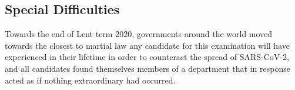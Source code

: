 \subsection*{Special Difficulties}
Towards the end of Lent term 2020, governments around the world moved towards the closest to martial law any candidate for this examination will have experienced in their lifetime in order to counteract the spread of SARS-CoV-2, and all candidates found themselves members of a department that in response acted as if nothing extraordinary had occurred.
